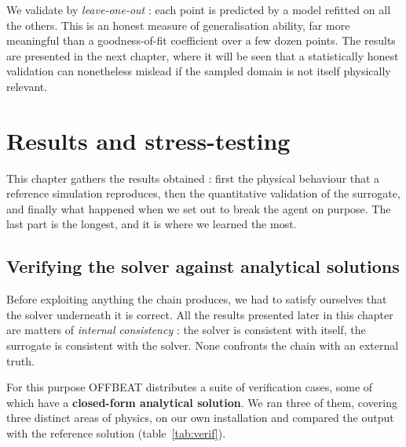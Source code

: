 \documentclass[12pt,a4paper]{report}
\begin{document}
We validate by \textit{leave-one-out} : each point is predicted by
a model refitted on all the others. This is an honest measure of generalisation
ability, far more meaningful than a goodness-of-fit coefficient over a few dozen
points. The results are presented in the next chapter, where it will be seen
that a statistically honest validation can nonetheless mislead if the sampled
domain is not itself physically relevant.

\clearpage

\clearpage
\chapter{Results and stress-testing}

This chapter gathers the results obtained : first the physical behaviour that a
reference simulation reproduces, then the quantitative validation of the
surrogate, and finally what happened when we set out to break the agent on
purpose. The last part is the longest, and it is where we learned the most.

\section{Verifying the solver against analytical solutions}
\label{sec:verification}

Before exploiting anything the chain produces, we had to satisfy ourselves that the
solver underneath it is correct. All the results presented later
in this chapter are matters of \emph{internal consistency} : the solver is
consistent with itself, the surrogate is consistent with the solver. None
confronts the chain with an external truth.

For this purpose OFFBEAT distributes a suite of verification cases, some of
which have a \textbf{closed-form analytical solution}. We ran three of them, covering three
distinct areas of physics, on our own installation and compared the output with
the reference solution (table~\ref{tab:verif}).
\end{document}
